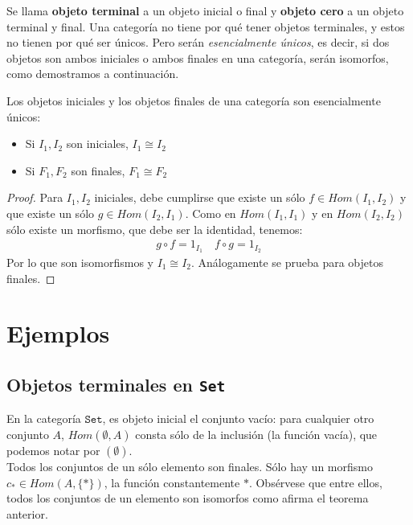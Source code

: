 \documentclass[11pt, fleqn, spanish]{book}
\begin{document}
    
    Se llama \textbf{objeto terminal} a un objeto inicial o final y \textbf{objeto cero} a un objeto
    terminal y final. Una categoría no tiene por qué
    tener objetos terminales, y estos no tienen por qué ser únicos. Pero serán \textit{esencialmente únicos},
    es decir, si dos objetos son ambos iniciales o ambos finales en una categoría, serán isomorfos,
    como demostramos a continuación.
    
    \begin{theorem} Los objetos iniciales y los objetos finales de una
    categoría son esencialmente únicos:
      \begin{itemize}
	\item Si $I_1,I_2$ son iniciales, $I_1 \cong I_2$
	\item Si $F_1,F_2$ son finales, $F_1 \cong F_2$
      \end{itemize}
    \end{theorem}

    \begin{proof}
      Para $I_1,I_2$ iniciales, debe cumplirse que existe un sólo $f \in Hom(I_1,I_2)$
      y que existe un sólo $g \in Hom(I_2,I_1)$. Como en $Hom(I_1,I_1)$ y en $Hom(I_2,I_2)$ sólo existe un morfismo,
      que debe ser la identidad, tenemos:
      \begin{gather*}
	g \circ f = 1_{I_1} \quad f \circ g = 1_{I_2}
      \end{gather*}
      Por lo que son isomorfismos y $I_1 \cong I_2$. Análogamente se prueba para objetos finales.
    \end{proof}
    
  \section {Ejemplos}
    \subsection {Objetos terminales en \texttt{Set}}
      En la categoría $\mathtt{Set}$, es objeto inicial el conjunto vacío: para cualquier otro
      conjunto $A$, $Hom(\emptyset, A)$ consta sólo de la inclusión (la función vacía), que 
      podemos notar por $(\emptyset)$. \\
      Todos los conjuntos de un sólo elemento son finales. Sólo hay un morfismo $c_\ast \in Hom(A,\{\ast\})$,
      la función constantemente $\ast$. Obsérvese que entre ellos, todos los conjuntos de un elemento
      son isomorfos como afirma el teorema anterior.
    
\end{document}
